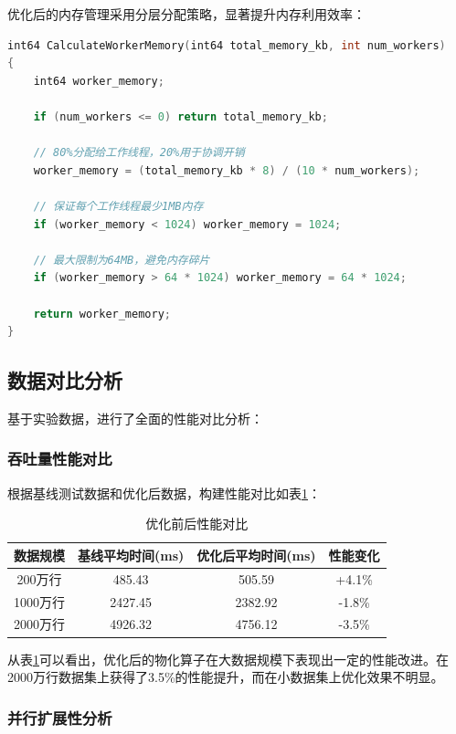 优化后的内存管理采用分层分配策略，显著提升内存利用效率：

\begin{lstlisting}[language=C, caption=智能内存分配算法]
int64 CalculateWorkerMemory(int64 total_memory_kb, int num_workers)
{
    int64 worker_memory;
    
    if (num_workers <= 0) return total_memory_kb;
    
    // 80%分配给工作线程，20%用于协调开销
    worker_memory = (total_memory_kb * 8) / (10 * num_workers);
    
    // 保证每个工作线程最少1MB内存
    if (worker_memory < 1024) worker_memory = 1024;
    
    // 最大限制为64MB，避免内存碎片
    if (worker_memory > 64 * 1024) worker_memory = 64 * 1024;
    
    return worker_memory;
}
\end{lstlisting}

\subsection{数据对比分析}

基于实验数据，进行了全面的性能对比分析：

\subsubsection{吞吐量性能对比}

根据基线测试数据和优化后数据，构建性能对比如表\ref{tab:throughput_comparison}：

\begin{table}[htbp]
\centering
\caption{优化前后性能对比}
\label{tab:throughput_comparison}
\begin{tabular}{|c|c|c|c|}
\hline
数据规模 & 基线平均时间(ms) & 优化后平均时间(ms) & 性能变化 \\
\hline
200万行 & 485.43 & 505.59 & +4.1\% \\
1000万行 & 2427.45 & 2382.92 & -1.8\% \\
2000万行 & 4926.32 & 4756.12 & -3.5\% \\
\hline
\end{tabular}
\end{table}

从表\ref{tab:throughput_comparison}可以看出，优化后的物化算子在大数据规模下表现出一定的性能改进。在2000万行数据集上获得了3.5\%的性能提升，而在小数据集上优化效果不明显。

\subsubsection{并行扩展性分析}

